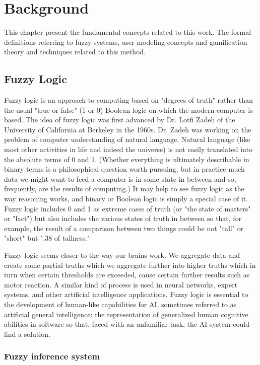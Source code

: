 
\chapter{Background}

This chapter present the fundamental concepts related to this work. The formal
definitions referring to fuzzy systems, user modeling concepts and gamification
theory and techniques related to this method.


\section{Fuzzy Logic}

Fuzzy logic is an approach to computing based on "degrees of truth" rather than
the usual "true or false" (1 or 0) Boolean logic on which the modern computer is
based. The idea of fuzzy logic was first advanced by Dr. Lotfi Zadeh of the
University of California at Berkeley in the 1960s. Dr. Zadeh was working on the
problem of computer understanding of natural language. Natural language (like
most other activities in life and indeed the universe) is not easily translated
into the absolute terms of 0 and 1. (Whether everything is ultimately
describable in binary terms is a philosophical question worth pursuing, but in
practice much data we might want to feed a computer is in some state in between
and so, frequently, are the results of computing.) It may help to see fuzzy
logic as the way reasoning works, and binary or Boolean logic is simply a
special case of it. Fuzzy logic includes 0 and 1 as extreme cases of truth (or
"the state of matters" or "fact") but also includes the various states of truth
in between so that, for example, the result of a comparison between two things
could be not "tall" or "short" but ".38 of tallness."

Fuzzy logic seems closer to the way our brains work. We aggregate data and
create some partial truths which we aggregate further into higher truths which
in turn when certain thresholds are exceeded, cause certain further results such
as motor reaction. A similar kind of process is used in neural networks, expert
systems, and other artificial intelligence applications. Fuzzy logic is
essential to the development of human-like capabilities for AI, sometimes
referred to as artificial general intelligence: the representation of
generalized human cognitive abilities in software so that, faced with an
unfamiliar task, the AI system could find a solution.

\subsection{Fuzzy inference system}

